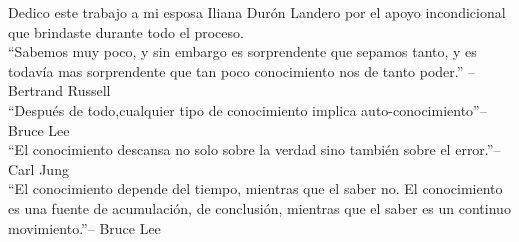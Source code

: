 
%






Dedico este trabajo a mi esposa Iliana Dur\'on Landero por el apoyo incondicional
que brindaste durante todo el proceso.\\
``Sabemos muy poco, y sin embargo es
sorprendente que sepamos tanto, y es todav\'ia mas sorprendente que tan poco
conocimiento nos de tanto poder.'' -- Bertrand Russell\\
``Despu\'es de todo,cualquier tipo de conocimiento implica auto-conocimiento''-- Bruce Lee \\
``El conocimiento descansa no solo sobre la verdad sino tambi\'en sobre el error.''-- Carl
Jung \\
``El conocimiento depende del tiempo, mientras que el saber no. El
conocimiento es una fuente de acumulación, de conclusión, mientras que el saber
es un continuo movimiento.''-- Bruce Lee
